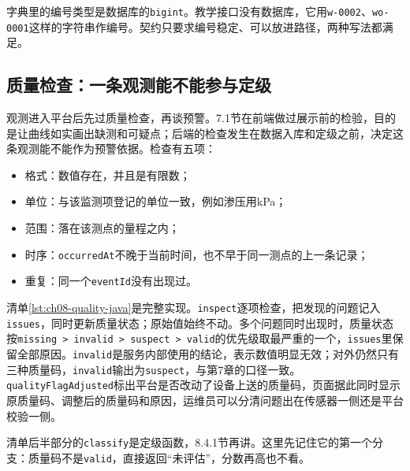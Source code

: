字典里的编号类型是数据库的\texttt{bigint}。教学接口没有数据库，它用\texttt{w-0002}、\texttt{wo-0001}这样的字符串作编号。契约只要求编号稳定、可以放进路径，两种写法都满足。

\subsection{质量检查：一条观测能不能参与定级}

观测进入平台后先过质量检查，再谈预警。7.1节在前端做过展示前的检验，目的是让曲线如实画出缺测和可疑点；后端的检查发生在数据入库和定级之前，决定这条观测能不能作为预警依据。检查有五项：
\begin{itemize}
\item 格式：数值存在，并且是有限数；
\item 单位：与该监测项登记的单位一致，例如渗压用kPa；
\item 范围：落在该测点的量程之内；
\item 时序：\texttt{occurredAt}不晚于当前时间，也不早于同一测点的上一条记录；
\item 重复：同一个\texttt{eventId}没有出现过。
\end{itemize}

清单\ref{lst:ch08-quality-java}是完整实现。\texttt{inspect}逐项检查，把发现的问题记入\texttt{issues}，同时更新质量状态；原始值始终不动。多个问题同时出现时，质量状态按\texttt{missing > invalid > suspect > valid}的优先级取最严重的一个，\texttt{issues}里保留全部原因。\texttt{invalid}是服务内部使用的结论，表示数值明显无效；对外仍然只有三种质量码，\texttt{invalid}输出为\texttt{suspect}，与第7章的口径一致。\texttt{qualityFlagAdjusted}标出平台是否改动了设备上送的质量码，页面据此同时显示原质量码、调整后的质量码和原因，运维员可以分清问题出在传感器一侧还是平台校验一侧。

清单后半部分的\texttt{classify}是定级函数，8.4.1节再讲。这里先记住它的第一个分支：质量码不是\texttt{valid}，直接返回“未评估”，分数再高也不看。

